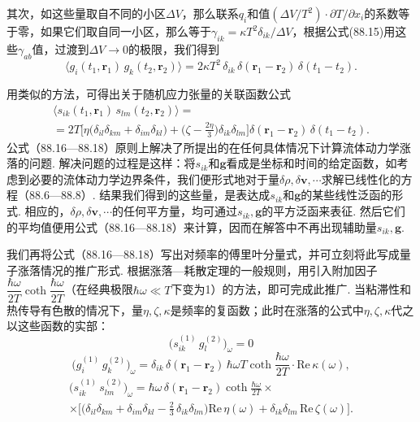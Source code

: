 其次，如这些量取自不同的小区$\Delta V$，那么联系$q_{i}$和值$(\Delta V/T^{2})\cdot\partial T/\partial x_{i}$的系数等于零，如果它们取自同一小区，那么等于$\gamma_{ik}=\kappa T^{2}\delta_{ik}/\Delta V$，根据公式(88.15)用这些$\gamma_{ab}$值，过渡到$\Delta V\to0$的极限，我们得到
\begin{equation}
\bigl\langle g_{i}(t_{1},\bm{r}_{1})\,g_{k}(t_{2},\bm{r}_{2})\bigr\rangle=2\kappa T^{2}\,\delta_{ik}\,\delta(\bm{r}_{1}-\bm{r}_{2})\,\delta(t_{1}-t_{2}).
\end{equation}

用类似的方法，可得出关于随机应力张量的关联函数公式
\begin{equation}
\begin{split}
\bigl\langle s_{ik}(t_{1},\bm{r}_{1})\,s_{lm}(t_{2},\bm{r}_{2})\bigr\rangle=\\
=2T\biggl[\eta\bigl(\delta_{il}\delta_{km}+\delta_{im}\delta_{kl}\bigr)+\biggl(\zeta-\frac{2\eta}{3}\biggr)\delta_{ik}\delta_{lm}\biggr]\delta(\bm{r}_{1}-\bm{r}_{2})\,\delta(t_{1}-t_{2}).
\end{split}
\end{equation}
公式（88.16—88.18）原则上解决了所提出的在任何具体情况下计算流体动力学涨落的问题. 解决问题的过程是这样：将$s_{ik}$和$\bm{g}$看成是坐标和时间的给定函数，如考虑到必要的流体动力学边界条件，我们便形式地对于量$\delta\rho,\delta\bm{v},\cdots$求解已线性化的方程（88.6—88.8）. 结果我们得到的这些量，是表达成$s_{ik}$和$\bm{g}$的某些线性泛函的形式. 相应的，$\delta\rho,\delta\bm{v},\cdots$的任何平方量，均可通过$s_{ik},\bm{g}$的平方泛函来表征. 然后它们的平均值便用公式（88.16—88.18）来计算，因而在解答中不再出现辅助量$s_{ik},\bm{g}$.

我们再将公式（88.16—88.18）写出对频率的傅里叶分量式，并可立刻将此写成量子涨落情况的推广形式. 根据涨落—耗散定理的一般规则，用引入附加因子$\dfrac{\hbar\omega}{2T}\coth\dfrac{\hbar\omega}{2T}$（在经典极限$\hbar\omega\ll T$下变为1）的方法，即可完成此推广. 当粘滞性和热传导有色散的情况下，量$\eta,\zeta,\kappa$是频率的复函数；此时在涨落的公式中$\eta,\zeta,\kappa$代之以这些函数的实部：
\begin{equation}
\bigl(s^{(1)}_{ik}\,g^{(2)}_{l}\bigr)_{\omega}=0
\end{equation}
\begin{equation}
\bigl(g^{(1)}_{i}\,g^{(2)}_{k}\bigr)_{\omega}=\delta_{ik}\,\delta(\bm{r}_{1}-\bm{r}_{2})\,\hbar\omega T\coth\frac{\hbar\omega}{2T}\cdot\mathrm{Re}\,\kappa(\omega),
\end{equation}
\begin{equation}
\begin{split}
\bigl(s^{(1)}_{ik}\,s^{(2)}_{lm}\bigr)_{\omega}=\hbar\omega\,\delta(\bm{r}_{1}-\bm{r}_{2})\coth\frac{\hbar\omega}{2T}\times\\
\times\biggl[\biggl(\delta_{il}\delta_{km}+\delta_{im}\delta_{kl}-\frac{2}{3}\,\delta_{ik}\delta_{lm}\biggr)\mathrm{Re}\,\eta(\omega)+\delta_{ik}\delta_{lm}\,\mathrm{Re}\,\zeta(\omega)\biggr].
\end{split}
\end{equation}


